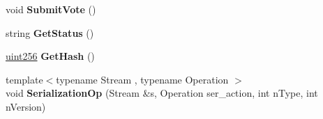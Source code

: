 \begin{DoxyCompactItemize}
void {\bfseries Submit\+Vote} ()
\item 
\mbox{\label{class_c_finalized_budget_a9a6fbb2d494342fb6d1c48a98d7cc856}} 
string {\bfseries Get\+Status} ()
\item 
\mbox{\label{class_c_finalized_budget_a0ce6295086247f5982f93ee3cea956e6}} 
\mbox{\hyperlink{classuint256}{uint256}} {\bfseries Get\+Hash} ()
\item 
\mbox{\label{class_c_finalized_budget_a1bbf758b27a7fb175e2889290f5ef78f}} 
{\footnotesize template$<$typename Stream , typename Operation $>$ }\\void {\bfseries Serialization\+Op} (Stream \&s, Operation ser\+\_\+action, int n\+Type, int n\+Version)
\end{DoxyCompactItemize}
